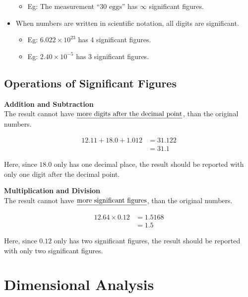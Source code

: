 \documentclass[
  14pt,
]{extarticle}
\providecommand{\tightlist}{%
  \setlength{\itemsep}{0pt}\setlength{\parskip}{0pt}}
\begin{document}
\begin{itemize}
  \begin{itemize}
  \tightlist
  \item
    Eg: The measurement ``\(30 \text{ eggs}\)'' has \(\infty\)
    significant figures.
  \end{itemize}
\item
  When numbers are written in scientific notation, all digits are
  significant.

  \begin{itemize}
  \tightlist
  \item
    Eg: \(6.022\times 10^{23}\) has 4 significant figures.
  \item
    Eg: \(2.40\times 10^{-5}\) has 3 significant figures.
  \end{itemize}
\end{itemize}

\hypertarget{operations-of-significant-figures}{%
\subsection{Operations of Significant
Figures}\label{operations-of-significant-figures}}

\textbf{Addition and Subtraction}\\
The result cannot have
\(\text{\underline{more digits after the decimal point}}\), than the
original numbers.

\[\begin{aligned}12.11+18.0+1.012 &=31.122 \\&=31.1\end{aligned}\]

Here, since \(18.0\) only has one decimal place, the result should be
reported with only one digit after the decimal point.

\textbf{Multiplication and Division}\\
The result cannot have \(\text{\underline{more significant figures}}\),
than the original numbers.

\[\begin{aligned}12.64\times 0.12 &= 1.5168 \\&=1.5\end{aligned}\]

Here, since \(0.12\) only has two significant figures, the result should
be reported with only two significant figures.

\hypertarget{dimensional-analysis}{%
\section{Dimensional Analysis}\label{dimensional-analysis}}
\end{document}
